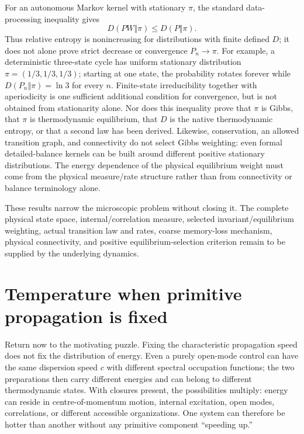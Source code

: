 \documentclass[11pt]{article}
\theoremstyle{definition}
\begin{document}
For an autonomous Markov kernel with stationary $\pi$, the standard
data-processing inequality \cite{KullbackLeibler1951,CoverThomas2006} gives
\begin{equation}
  D(PW\Vert\pi)\leq D(P\Vert\pi).
  \label{eq:relative-entropy-contraction}
\end{equation}
Thus relative entropy is nonincreasing for distributions with finite defined $D$;
it does not alone prove strict decrease or convergence $P_n\to\pi$.  For example,
a deterministic three-state cycle has uniform stationary distribution
$\pi=(1/3,1/3,1/3)$; starting at one state, the probability rotates forever while
$D(P_n\Vert\pi)=\ln 3$ for every $n$.  Finite-state irreducibility together with
aperiodicity is one sufficient additional condition for convergence, but is not obtained
from stationarity alone.  Nor does this inequality prove that $\pi$ is Gibbs, that
$\pi$ is thermodynamic equilibrium, that $D$ is the native thermodynamic entropy, or that
a second law has been derived.  Likewise, conservation, an allowed transition graph, and
connectivity do not select Gibbs weighting: even formal detailed-balance kernels can be built
around different positive stationary distributions.  The energy dependence of the physical
equilibrium weight must come from the physical measure/rate structure rather than from
connectivity or balance terminology alone.

These results narrow the microscopic problem without closing it.  The complete physical
state space, internal/correlation measure, selected invariant/equilibrium weighting, actual
transition law and rates, coarse memory-loss mechanism, physical connectivity, and positive
equilibrium-selection criterion remain to be supplied by the underlying dynamics.

\section{Temperature when primitive propagation is fixed}
\label{sec:temperature}
Return now to the motivating puzzle.  Fixing the characteristic propagation speed does not
fix the distribution of energy.  Even a purely open-mode control can have the same dispersion
speed $c$ with different spectral occupation functions; the two preparations then carry
different energies and can belong to different thermodynamic states.  With closures present,
the possibilities multiply: energy can reside in centre-of-momentum motion, internal
excitation, open modes, correlations, or different accessible organizations.  One system can
therefore be hotter than another without any primitive component ``speeding up.''
\end{document}

